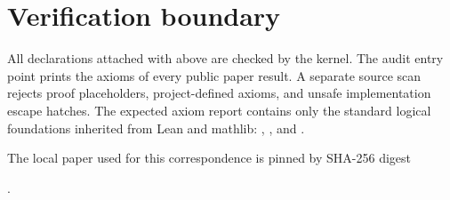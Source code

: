 \section{Verification boundary}

All declarations attached with  above are
checked by the kernel.  The audit entry point prints the axioms of every public
paper result.  A separate source scan rejects proof placeholders,
project-defined axioms, and unsafe implementation escape hatches.  The expected
axiom report contains only the standard logical foundations inherited from
Lean and mathlib: , , and
.

The local paper used for this correspondence is pinned by SHA-256 digest
\begin{center}
.
\end{center}
